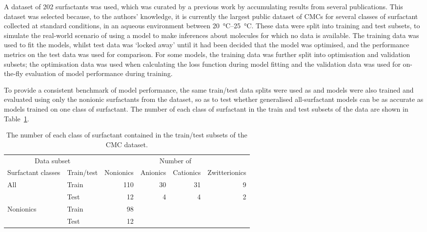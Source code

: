 A dataset of 202 surfactants was used, which was curated by a previous work
\cite{qinPredictingCriticalMicelle2021a} by accumulating results from several
publications. This dataset was selected because, to the authors' knowledge, it
is currently the largest public dataset of CMCs for several classes of
surfactant collected at standard conditions, in an aqueous environment between
\SIrange{20}{25}{\celsius}. These data were split into training and test
subsets, to simulate the real-world scenario of using a model to make inferences
about molecules for which no data is available. The training data was used to
fit the models, whilst test data was `locked away' until it had been decided
that the model was optimised, and the performance metrics on the test data was
used for comparison. For some models, the training data was further split into
optimisation and validation subsets; the optimisation data was used when
calculating the loss function during model fitting and the validation data was
used for on-the-fly evaluation of model performance during training.

To provide a consistent benchmark of model performance, the same train/test data
splits were used as \citet{qinPredictingCriticalMicelle2021a} and models were
also trained and evaluated using only the nonionic surfactants from the dataset,
so as to test whether generalised all-surfactant models can be as accurate as
models trained on one class of surfactant. The number of each class of
surfactant in the train and test subsets of the data are shown in
Table~\ref{tab:data-split}.

\begin{table}
    \centering
    \caption{The number of each class of surfactant contained in the train/test subsets of the CMC dataset.}
    \label{tab:data-split}
    \begin{tabular}{@{}llrrrr@{}} \toprule \multicolumn{2}{c}{Data subset} & \multicolumn{4}{c}{Number of}                                                    \\
               \cmidrule(r){1-2}\cmidrule(l){3-6}  Surfactant classes  & Train/test                    & Nonionics & Anionics & Cationics & Zwitterionics \\
               \midrule All                                            & Train                         & 110       & 30       & 31        & 9             \\
                                                                       & Test                          & 12        & 4        & 4         & 2             \\
               Nonionics                                               & Train                         & 98        &          &           &               \\
                                                                       & Test                          & 12        &          &           &               \\\bottomrule
    \end{tabular}
\end{table}


